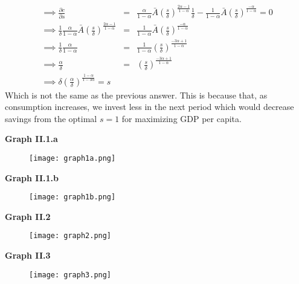 \documentclass[11pt]{SelfArxOneColBMN}
\begin{document}
\begin{enumerate}
\begin{eqnarray*}
    \implies \frac{\partial c}{\partial s} &=& \frac{\alpha}{1 - \alpha}\bar{A}(\frac{s}{\delta})^\frac{2\alpha - 1}{1 - \alpha}\frac{1}{\delta} - \frac{1}{1 - \alpha}\bar{A}(\frac{s}{\delta})^\frac{-\alpha}{1 - \alpha} = 0\\
    \implies \frac{1}{\delta}\frac{\alpha}{1 - \alpha}\bar{A}(\frac{s}{\delta})^\frac{2\alpha - 1}{1 - \alpha} &=& \frac{1}{1 - \alpha}\bar{A}(\frac{s}{\delta})^\frac{-\alpha}{1 - \alpha}\\
    \implies \frac{1}{\delta}\frac{\alpha}{1 - \alpha} &=& \frac{1}{1 - \alpha}(\frac{s}{\delta})^\frac{-3\alpha + 1}{1 - \alpha}\\
    \implies \frac{\alpha}{\delta} &=& (\frac{s}{\delta})^\frac{-3\alpha + 1}{1 - \alpha}\\
    \implies \delta(\frac{\alpha}{\delta})^\frac{1 - \alpha}{1 - 3\alpha} = s
  \end{eqnarray*}
  Which is not the same as the previous answer. This is because that, as consumption increases, we invest less in the next period which would decrease savings from the optimal $s = 1$ for maximizing GDP per capita.
\end{enumerate}

\newpage
\clearpage
\noindent \textbf{Graph II.1.a}
\begin{figure}[h]
  \texttt{[image: graph1a.png]}
  \end{figure}

\newpage
\clearpage
\noindent \textbf{Graph II.1.b}
\begin{figure}[h]
  \texttt{[image: graph1b.png]}
  \end{figure}

\newpage
\clearpage
\noindent \textbf{Graph II.2}
\begin{figure}[h]
  \texttt{[image: graph2.png]}
  \end{figure}

\newpage
\clearpage
\noindent \textbf{Graph II.3}
\begin{figure}[h]
  \texttt{[image: graph3.png]}
  \end{figure}
\end{document}
